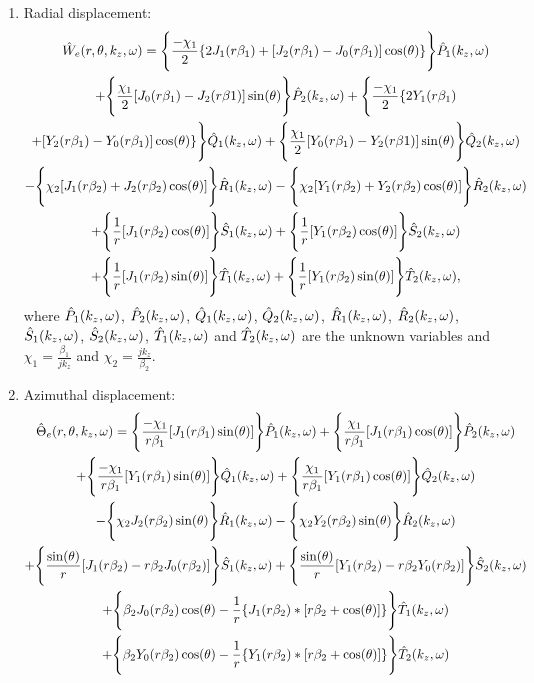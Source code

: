 \documentclass[11pt,cleanfoot]{asme2ej}
\begin{document}
\begin{enumerate}[label=(\alph*)]
    \item Radial displacement:
    \begin{multline}\label{Radial displacement 3d}
    \Hat{W}_{e}(r,\theta,k_z,\omega) = \Bigg\{\frac{-\chi_1}{2}\{2J_1(r\beta_1) + [J_2(r\beta_1) - J_0(r\beta_1)]\cos(\theta)\}\Bigg\}\Hat{P}_1(k_z,\omega)\\ + \Bigg\{\frac{\chi_1}{2}[J_0(r\beta_1) - J_2(r\beta1)]\sin(\theta)\Bigg\}\Hat{P}_2(k_z,\omega) + \Bigg\{\frac{-\chi_1}{2}\{2Y_1(r\beta_1)\\ + [Y_2(r\beta_1)-Y_0(r\beta_1)]\cos(\theta)\}\Bigg\}\Hat{Q}_1(k_z,\omega) + \Bigg\{\frac{\chi_1}{2}[Y_0(r\beta_1)-Y_2(r\beta1)]\sin(\theta)\Bigg\}\Hat{Q}_2(k_z,\omega)\\ - \Bigg\{\chi_2[J_1(r\beta_2)+J_2(r\beta_2)\cos(\theta)]\Bigg\}\Hat{R}_1(k_z,\omega) - \Bigg\{\chi_2[Y_1(r\beta_2) + Y_2(r\beta_2)\cos(\theta)]\Bigg\}\Hat{R}_2(k_z,\omega)\\ + \Bigg\{\frac{1}{r}[J_1(r\beta_2)\cos(\theta)]\Bigg\}\Hat{S}_1(k_z,\omega) + \Bigg\{\frac{1}{r}[Y_1(r\beta_2)\cos(\theta)]\Bigg\}\Hat{S}_2(k_z,\omega)\\ + \Bigg\{\frac{1}{r}[J_1(r\beta_2)\sin(\theta)]\Bigg\}\Hat{T}_1(k_z,\omega) + \Bigg\{\frac{1}{r}[Y_1(r\beta_2)\sin(\theta)]\Bigg\}\Hat{T}_2(k_z,\omega),
    \end{multline}
    where $\Hat{P}_1(k_z,\omega)$, $\Hat{P}_2(k_z,\omega)$, $\Hat{Q}_1(k_z,\omega)$, $\Hat{Q}_2(k_z,\omega)$, $\Hat{R}_1(k_z,\omega)$, $\Hat{R}_2(k_z,\omega)$, $\Hat{S}_1(k_z,\omega)$, $\Hat{S}_2(k_z,\omega)$, $\Hat{T}_1(k_z,\omega)$ and $\Hat{T}_2(k_z,\omega)$ are the unknown variables and $\chi_{1} = \frac{\beta_1}{jk_z}$ and $\chi_{2} =\frac{jk_z}{\beta_2}$.
    \item Azimuthal displacement:
    \begin{multline}\label{Azimuthal displacement 3d}
    \Hat{\Theta}_e(r,\theta,k_z,\omega) = \Bigg\{\frac{-\chi_1}{r\beta_1}[J_1(r\beta_1)\sin(\theta)]\Bigg\}\Hat{P}_1(k_z,\omega) + \Bigg\{\frac{\chi_1}{r\beta_1}[J_1(r\beta_1)\cos(\theta)]\Bigg\}\Hat{P}_2(k_z,\omega)\\ + \Bigg\{\frac{-\chi_1}{r\beta_1}[Y_1(r\beta_1)\sin(\theta)]\Bigg\}\Hat{Q}_1(k_z,\omega) + \Bigg\{\frac{\chi_1}{r\beta_1}[Y_1(r\beta_1)\cos(\theta)]\Bigg\}\Hat{Q}_2(k_z,\omega)\\ - \Bigg\{\chi_2J_2(r\beta_2)\sin(\theta)\Bigg\}\Hat{R}_1(k_z,\omega) - \Bigg\{\chi_2Y_2(r\beta_2)\sin(\theta)\Bigg\}\Hat{R}_2(k_z,\omega)\\ + \Bigg\{\frac{\sin(\theta)}{r}[J_1(r\beta_2)-r\beta_2J_0(r\beta_2)]\Bigg\}\Hat{S}_1(k_z,\omega) + \Bigg\{\frac{\sin(\theta)}{r}[Y_1(r\beta_2)-r\beta_2Y_0(r\beta_2)]\Bigg\}\Hat{S}_2(k_z,\omega)\\ + \Bigg\{\beta_2J_0(r\beta_2)\cos(\theta)-\frac{1}{r}\{J_1(r\beta_2)*[r\beta_2+\cos(\theta)]\}\Bigg\}\Hat{T}_1(k_z,\omega)\\ + \Bigg\{\beta_2Y_0(r\beta_2)\cos(\theta)-\frac{1}{r}\{Y_1(r\beta_2)*[r\beta_2+\cos(\theta)]\}\Bigg\}\Hat{T}_2(k_z,\omega)

\end{multline}
\end{enumerate}
\end{document}
